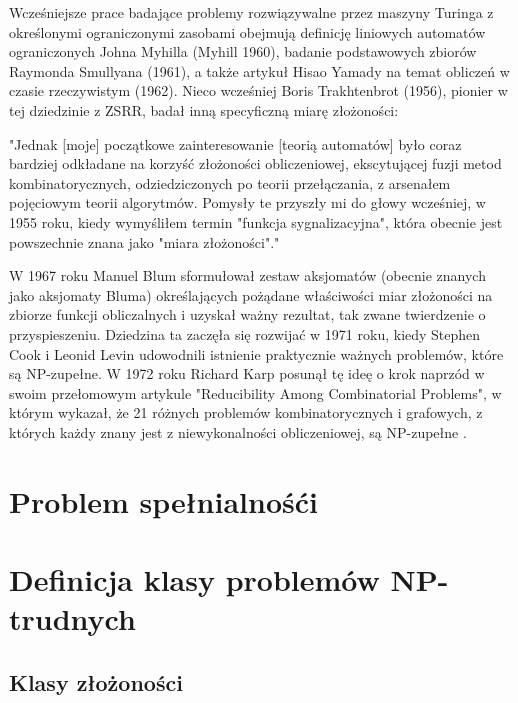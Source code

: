 Wcześniejsze prace badające problemy rozwiązywalne przez maszyny Turinga z określonymi ograniczonymi zasobami obejmują \cite{FortnowH03} definicję liniowych automatów ograniczonych Johna Myhilla (Myhill 1960), badanie podstawowych zbiorów Raymonda Smullyana (1961), a także artykuł Hisao Yamady \cite{Yamada62a} na temat obliczeń w czasie rzeczywistym (1962). Nieco wcześniej Boris Trakhtenbrot (1956), pionier w tej dziedzinie z ZSRR, badał inną specyficzną miarę złożoności:

"Jednak [moje] początkowe zainteresowanie [teorią automatów] było coraz bardziej odkładane na korzyść złożoności obliczeniowej, ekscytującej fuzji metod kombinatorycznych, odziedziczonych po teorii przełączania, z arsenałem pojęciowym teorii algorytmów. Pomysły te przyszły mi do głowy wcześniej, w 1955 roku, kiedy wymyśliłem termin "funkcja sygnalizacyjna", która obecnie jest powszechnie znana jako "miara złożoności"\cite{Trakhtenbrot08}."

W 1967 roku Manuel Blum sformułował zestaw aksjomatów (obecnie znanych jako aksjomaty Bluma) określających pożądane właściwości miar złożoności na zbiorze funkcji obliczalnych i uzyskał ważny rezultat, tak zwane twierdzenie o przyspieszeniu. Dziedzina ta zaczęła się rozwijać w 1971 roku, kiedy Stephen Cook i Leonid Levin udowodnili istnienie praktycznie ważnych problemów, które są NP-zupełne. W 1972 roku Richard Karp posunął tę ideę o krok naprzód w swoim przełomowym artykule "Reducibility Among Combinatorial Problems", w którym wykazał, że 21 różnych problemów kombinatorycznych i grafowych, z których każdy znany jest z niewykonalności obliczeniowej, są NP-zupełne \cite{Karp86}.


\section{Problem spełnialnośći}

\section{Definicja klasy problemów NP-trudnych}

\subsection{Klasy złożoności}



